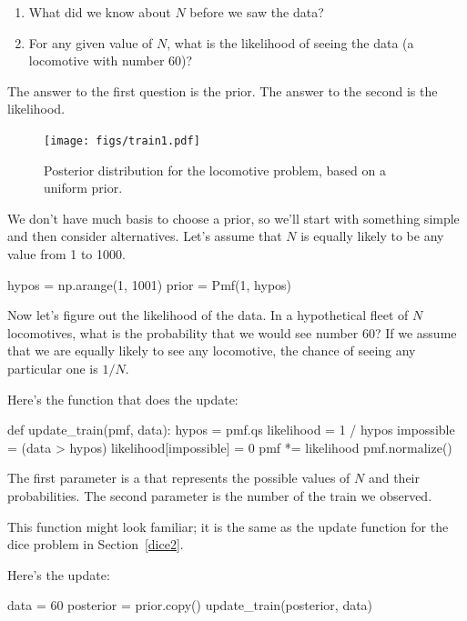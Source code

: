 \documentclass[12pt]{book}
\theoremstyle{exercise}
\begin{document}
\begin{enumerate}

\item What did we know about $N$ before we saw the data?

\item For any given value of $N$, what is the likelihood of
seeing the data (a locomotive with number 60)?

\end{enumerate}

The answer to the first question is the prior.  The answer to the
second is the likelihood.

\begin{figure}
\centerline{\texttt{[image: figs/train1.pdf]}}
\caption{Posterior distribution for the locomotive problem, based
on a uniform prior.}
\label{fig.train1}
\end{figure}

We don't have much basis to choose a prior, so we'll start with
something simple and then consider alternatives.  
Let's assume that $N$ is equally likely to be any value from 1 to 1000.

\begin{code}
hypos = np.arange(1, 1001)
prior = Pmf(1, hypos)
\end{code}

Now let's figure out the likelihood of the data.
In a hypothetical fleet of $N$ locomotives, what is the probability that we would see number 60?
If we assume that we are equally likely to see any locomotive, the chance of seeing any particular one is $1/N$.

Here's the function that does the update:

\begin{code}
def update_train(pmf, data):
    hypos = pmf.qs
    likelihood = 1 / hypos
    impossible = (data > hypos)
    likelihood[impossible] = 0
    pmf *= likelihood
    pmf.normalize()
\end{code}

The first parameter is a  that represents the possible values of $N$ and their probabilities.
The second parameter is the number of the train we observed.

This function might look familiar; it is the same as the update function for the dice problem in Section~\ref{dice2}.


Here's the update:

\begin{code}
data = 60
posterior = prior.copy()
update_train(posterior, data)
\end{code}
\end{document}
